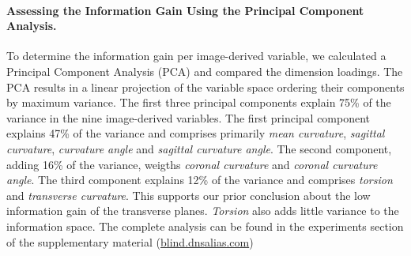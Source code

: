 \documentclass[a4paper,twoside]{style/article}
\begin{document}
\paragraph{Assessing the Information Gain Using the Principal Component Analysis.}
To determine the information gain per image-derived variable, we calculated a Principal Component Analysis (PCA) and compared the dimension loadings.
The PCA results in a linear projection of the variable space ordering their components by maximum variance.
The first three principal components explain 75\% of the variance in the nine image-derived variables.
The first principal component explains 47\% of the variance and comprises primarily \emph{mean curvature}, \emph{sagittal curvature}, \emph{curvature angle} and \emph{sagittal curvature angle}.
The second component, adding 16\% of the variance, weigths \emph{coronal curvature} and \emph{coronal curvature angle}.
The third component explains 12\% of the variance and comprises \emph{torsion} and \emph{transverse curvature}.
This supports our prior conclusion about the low information gain of the transverse planes.
\emph{Torsion} also adds little variance to the information space.
The complete analysis can be found in the experiments section of the supplementary material (\url{blind.dnsalias.com})
\end{document}
